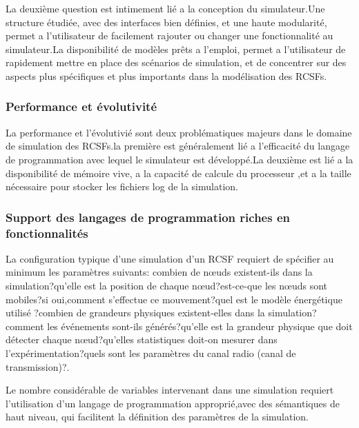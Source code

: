 La deuxième question est intimement lié a la conception du simulateur.Une structure étudiée, avec des interfaces bien définies, et une haute modularité, permet a l'utilisateur de facilement rajouter ou changer une fonctionnalité au simulateur.La disponibilité de modèles prêts a l'emploi, permet a l'utilisateur de rapidement mettre en place des scénarios de simulation, et de concentrer sur des aspects plus spécifiques et plus importants dans la modélisation des RCSFs.
\subsubsection{Performance et évolutivité }
La performance et l'évolutivié sont deux problématiques majeurs dans le domaine de simulation des RCSFs.la première est généralement lié a l'efficacité du langage de programmation avec lequel le simulateur est développé.La deuxième est lié a la disponibilité de mémoire vive, a la capacité de calcule du processeur ,et a la taille nécessaire pour stocker les fichiers log de la simulation.
\subsubsection{Support des langages de programmation riches en fonctionnalités}
La configuration typique d'une simulation d'un RCSF requiert de spécifier au minimum les paramètres suivants:
combien de nœuds existent-ils dans la simulation?qu'elle est la position de chaque nœud?est-ce-que les nœuds sont mobiles?si oui,comment s'effectue ce mouvement?quel est le modèle énergétique utilisé ?combien de grandeurs physiques existent-elles dans la simulation?comment les événements sont-ils générés?qu'elle est la grandeur physique que doit détecter chaque nœud?qu'elles statistiques doit-on mesurer dans l'expérimentation?quels sont les paramètres du canal radio (canal de transmission)?.

Le nombre considérable de variables intervenant dans une simulation requiert l'utilisation d'un langage de programmation approprié,avec des sémantiques de haut niveau, qui facilitent la définition des  paramètres de la simulation.
